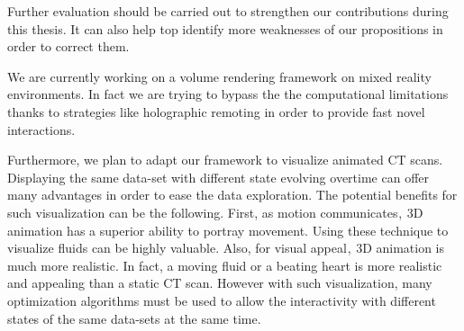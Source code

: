 Further evaluation should be carried out to strengthen our contributions during this thesis. It can also help top identify more weaknesses of our propositions in order to correct them. 

We are currently working on a  volume rendering framework on mixed reality environments.  In fact we are trying to bypass the the computational limitations thanks to strategies like holographic remoting in order to provide fast novel interactions. 

Furthermore, we plan to adapt our framework to visualize animated CT scans. Displaying the same data-set with different state evolving overtime can offer many advantages in order to ease the data exploration. The potential benefits for such visualization can be the following. First, as motion communicates ,  3D animation has a superior ability to portray movement. Using these technique to visualize fluids can be highly valuable. Also, for visual appeal ,  3D animation is much more realistic. In fact, a moving fluid or a beating heart is more realistic and appealing than a static CT scan. However with such visualization, many optimization algorithms must be used to allow the interactivity with different states of the same data-sets at the same time.